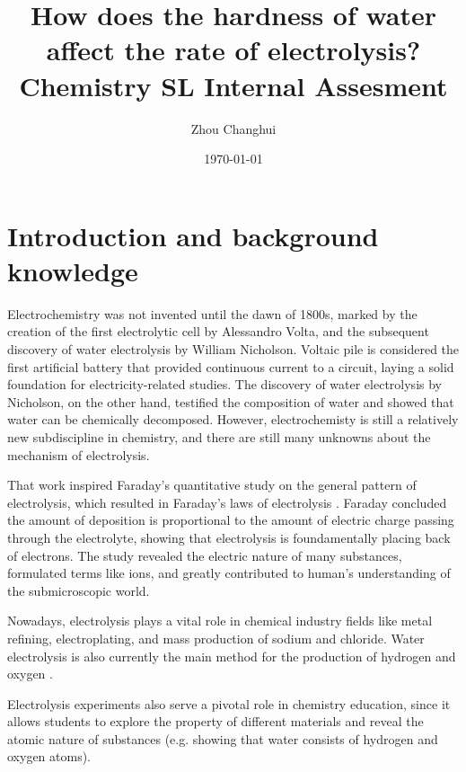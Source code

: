 \documentclass[a4paper]{article}
\begin{document}
\begin{titlepage}
    \title{\textbf{How does the hardness of water affect the rate of electrolysis? \\ \small Chemistry SL Internal Assesment}}
    \author{Zhou Changhui}
    \date{\today}
    \maketitle
\end{titlepage}

\section{Introduction and background knowledge}

Electrochemistry was not invented until the dawn of 1800s, marked by the creation of the first electrolytic cell by Alessandro Volta, and the subsequent discovery of water electrolysis by William Nicholson\cite{fabbrizzi2019strange}. Voltaic pile is considered the first artificial battery that provided continuous current to a circuit, laying a solid foundation for electricity-related studies. The discovery of water electrolysis by Nicholson, on the other hand, testified the composition of water and showed that water can be chemically decomposed. However, electrochemisty is still a relatively new subdiscipline in chemistry, and there are still many unknowns about the mechanism of electrolysis.

That work inspired Faraday's quantitative study on the general pattern of electrolysis, which resulted in Faraday's laws of electrolysis \cite{stock1991pathway}. Faraday concluded the amount of deposition is proportional to the amount of electric charge passing through the electrolyte, showing that electrolysis is foundamentally placing back of electrons. The study revealed the electric nature of many substances, formulated terms like ions, and greatly contributed to human's understanding of the submicroscopic world. 

Nowadays, electrolysis plays a vital role in chemical industry fields like metal refining, electroplating, and mass production of sodium and chloride. Water electrolysis is also currently the main method for the production of hydrogen and oxygen \cite{flowers-2019}.

Electrolysis experiments also serve a pivotal role in chemistry education, since it allows students to explore the property of different materials and reveal the atomic nature of substances (e.g. showing that water consists of hydrogen and oxygen atoms).
\end{document}

